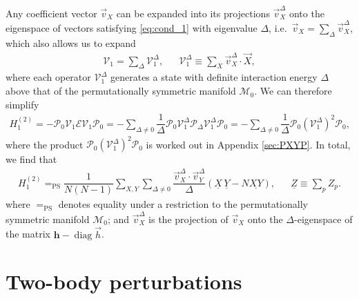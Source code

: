 \documentclass[nofootinbib,notitlepage,11pt]{revtex4-2}
\newcommand{\f}[2]{\dfrac{#1}{#2}} %
\newcommand{\p}[1]{\left(#1\right)} %
\renewcommand{\c}{\cdot} %
\newcommand{\m}{\bm} %
\renewcommand{\v}{\vec} %
\newcommand{\1}{\mathds{1}}
\newcommand{\E}{\mathcal{E}}
\newcommand{\M}{\mathcal{M}}
\renewcommand{\P}{\mathcal{P}}
\newcommand{\V}{\mathcal{V}}
\newcommand{\EQPS}{=_{\text{PS}}}
\newcommand{\col}{\underline}
\DeclareMathOperator{\diag}{diag}
\begin{document}

Any coefficient vector $\v v_X$ can be expanded into its projections
$\v v_X^\Delta$ onto the eigenspace of vectors satisfying
\eqref{eq:cond_1} with eigenvalue $\Delta$,
i.e.~$\v v_X = \sum_\Delta \v v_X^\Delta$, which also allows us to
expand
\begin{align}
  \V_1 = \sum_\Delta \V_1^\Delta,
  &&
  \V_1^\Delta \equiv \sum_X \v v_X^\Delta \c \v X,
\end{align}
where each operator $\V_1^\Delta$ generates a state with definite
interaction energy $\Delta$ above that of the permutationally
symmetric manifold $\M_0$.  We can therefore simplify
\begin{align}
  H_1^{(2)}
  = - \P_0 \V_1 \E \V_1 \P_0
  = - \sum_{\Delta\ne0} \f1{\Delta}
  \P_0 \V_1^\Delta \P_\Delta \V_1^\Delta \P_0
  = - \sum_{\Delta\ne0} \f1{\Delta} \P_0 \p{\V_1^\Delta}^2 \P_0,
\end{align}
where the product $\P_0 \p{\V_1^\Delta}^2 \P_0$ is worked out in
Appendix \ref{sec:PXYP}.  In total, we find that
\begin{align}
  H_1^{(2)}
  \EQPS \f1{N\p{N-1}} \sum_{X,Y} \sum_{\Delta\ne0}
  \f{\v v_X^\Delta\c\v v_Y^\Delta}{\Delta}
  \p{\col{X}\,\col{Y} - N \col{XY}},
  &&
  \col{Z} \equiv \sum_p Z_p.
  \label{eq:H_1_2}
\end{align}
where $\EQPS$ denotes equality under a restriction to the
permutationally symmetric manifold $\M_0$; and $\v v_X^\Delta$ is the
projection of $\v v_X$ onto the $\Delta$-eigenspace of the matrix
$\m h-\diag\v h$.

\section{Two-body perturbations}
\label{sec:two_body_pert}
\end{document}
